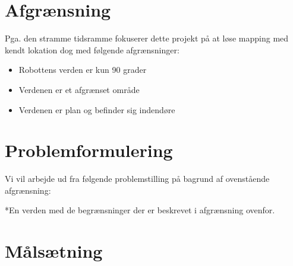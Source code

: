 \section*{Afgrænsning}
Pga. den stramme tidsramme fokuserer dette projekt på at løse mapping med kendt lokation dog med følgende afgrænsninger:
\begin{itemize}
\item Robottens verden er kun 90 grader
\item Verdenen er et afgrænset område
\item Verdenen er plan og befinder sig indendøre
\end{itemize}

\section*{Problemformulering}
Vi vil arbejde ud fra følgende problemstilling på bagrund af ovenstående afgrænsning:

\begin{samepage}


\end{samepage}
*En verden med de begrænsninger der er beskrevet i afgrænsning ovenfor.

\section*{Målsætning}
